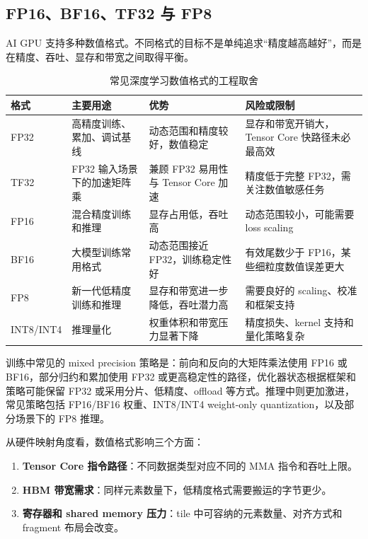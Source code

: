 \subsection{FP16、BF16、TF32 与 FP8}
\label{subsec:precision-formats}

AI GPU 支持多种数值格式。不同格式的目标不是单纯追求“精度越高越好”，而是在精度、吞吐、显存和带宽之间取得平衡。

\begin{table}[H]
  \centering
  \caption{常见深度学习数值格式的工程取舍}
  \label{tab:numeric-format-tradeoff}
  \begin{tabular}{p{2.0cm}p{3.2cm}p{4.2cm}p{4.2cm}}
    \toprule
    格式 & 主要用途 & 优势 & 风险或限制 \\
    \midrule
    FP32 & 高精度训练、累加、调试基线 & 动态范围和精度较好，数值稳定 & 显存和带宽开销大，Tensor Core 快路径未必最高效 \\
    TF32 & FP32 输入场景下的加速矩阵乘 & 兼顾 FP32 易用性与 Tensor Core 加速 & 精度低于完整 FP32，需关注数值敏感任务 \\
    FP16 & 混合精度训练和推理 & 显存占用低，吞吐高 & 动态范围较小，可能需要 loss scaling \\
    BF16 & 大模型训练常用格式 & 动态范围接近 FP32，训练稳定性好 & 有效尾数少于 FP16，某些细粒度数值误差更大 \\
    FP8 & 新一代低精度训练和推理 & 显存和带宽进一步降低，吞吐潜力高 & 需要良好的 scaling、校准和框架支持 \\
    INT8/INT4 & 推理量化 & 权重体积和带宽压力显著下降 & 精度损失、kernel 支持和量化策略复杂 \\
    \bottomrule
  \end{tabular}
\end{table}

训练中常见的 mixed precision 策略是：前向和反向的大矩阵乘法使用 FP16 或 BF16，部分归约和累加使用 FP32 或更高稳定性的路径，优化器状态根据框架和策略可能保留 FP32 或采用分片、低精度、offload 等方式。推理中则更加激进，常见策略包括 FP16/BF16 权重、INT8/INT4 weight-only quantization，以及部分场景下的 FP8 推理。

从硬件映射角度看，数值格式影响三个方面：

\begin{enumerate}
  \item \textbf{Tensor Core 指令路径}：不同数据类型对应不同的 MMA 指令和吞吐上限。
  \item \textbf{HBM 带宽需求}：同样元素数量下，低精度格式需要搬运的字节更少。
  \item \textbf{寄存器和 shared memory 压力}：tile 中可容纳的元素数量、对齐方式和 fragment 布局会改变。
\end{enumerate}


